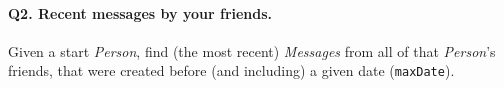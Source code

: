 \paragraph{\textbf{Q2}. Recent messages by your friends.}
Given a start \emph{Person}, find (the most recent) \emph{Messages} from
all of that \emph{Person}'s friends, that were created before (and
including) a given date (\texttt{maxDate}).
